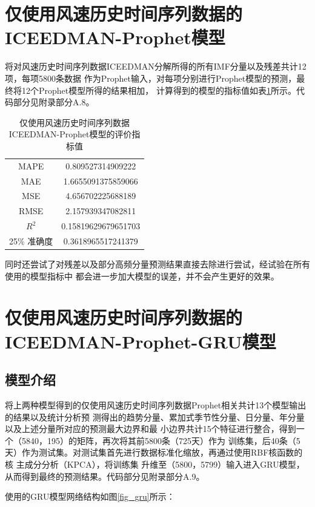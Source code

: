 \documentclass[AutoFakeBold]{LZUThesis}
\begin{document}
\section{仅使用风速历史时间序列数据的ICEEDMAN-Prophet模型}
将对风速历史时间序列数据ICEEDMAN分解所得的所有IMF分量以及残差共计12项，每项5800条数据
作为Prophet输入，对每项分别进行Prophet模型的预测，最终将12个Prophet模型所得的结果相加，
计算得到的模型的指标值如表\ref{wind_iceemdan_prophet_result}所示。代码部分见附录部分A.8。

\begin{table}[H]
    \centering
    \caption{仅使用风速历史时间序列数据ICEEDMAN-Prophet模型的评价指标值}
    \begin{tabular}{cc}
    \toprule
    MAPE & 0.809527314909222 \\
    MAE & 1.6655091375859066 \\
    MSE & 4.656702225688189 \\
    RMSE & 2.157939347082811 \\
    $R^2$ & 0.15819629679651703 \\
    25\% 准确度 & 0.3618965517241379 \\
    \bottomrule
    \end{tabular}
    \label{wind_iceemdan_prophet_result}
\end{table}

同时还尝试了对残差以及部分高频分量预测结果直接去除进行尝试，经试验在所有使用的模型指标中
都会进一步加大模型的误差，并不会产生更好的效果。

\section{仅使用风速历史时间序列数据的ICEEDMAN-Prophet-GRU模型}
\subsection{模型介绍}
将上两种模型得到的仅使用风速历史时间序列数据Prophet相关共计13个模型输出的结果以及统计分析预
测得出的趋势分量、累加式季节性分量、日分量、年分量以及上述分量所对应的预测最大边界和最
小边界共计15个特征进行整合，得到一个（5840，195）的矩阵，再次将其前5800条（725天）作为
训练集，后40条（5天）作为测试集。对测试集首先进行数据标准化缩放，再通过使用RBF核函数的核
主成分分析（KPCA），将训练集
升维至（5800，5799）输入进入GRU模型，从而得到最终的预测结果。代码部分见附录部分A.9。

使用的GRU模型网络结构如图\ref{fig_gru}所示：
\end{document}
